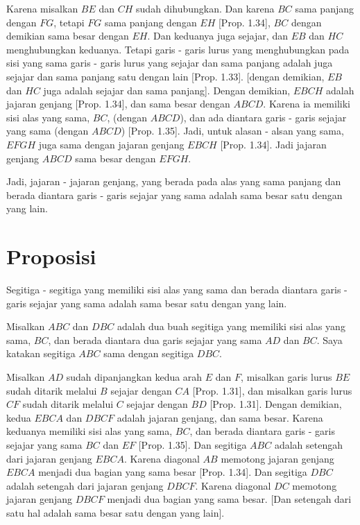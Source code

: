 \documentclass[a4paper]{book}
\begin{document}
Karena misalkan $BE$ dan $CH$ sudah dihubungkan. Dan karena $BC$ sama panjang 
dengan $FG$, tetapi $FG$ sama panjang dengan $EH$ [Prop. 1.34], $BC$ dengan 
demikian sama besar dengan $EH$. Dan keduanya juga sejajar, dan $EB$ dan $HC$
menghubungkan keduanya. Tetapi garis - garis lurus yang menghubungkan pada sisi 
yang sama garis - garis lurus yang sejajar dan sama panjang adalah juga sejajar
dan sama panjang satu dengan lain [Prop. 1.33]. [dengan demikian, $EB$ dan $HC$
juga adalah sejajar dan sama panjang]. Dengan demikian, $EBCH$ adalah jajaran 
genjang [Prop. 1.34], dan sama besar dengan $ABCD$. Karena ia memiliki sisi
alas yang  sama, $BC$, (dengan $ABCD$), dan  ada diantara garis -  garis 
sejajar yang sama (dengan $ABCD$) [Prop. 1.35]. Jadi, untuk alasan - alsan yang
sama, $EFGH$ juga sama dengan jajaran genjang $EBCH$ [Prop. 1.34]. Jadi jajaran
genjang $ABCD$ sama besar dengan $EFGH$.

Jadi, jajaran - jajaran genjang, yang berada pada alas yang sama panjang dan
 berada diantara garis - garis sejajar yang sama adalah sama besar satu 
dengan yang lain.

\section*{\centering Proposisi \thesection} 
Segitiga - segitiga yang memiliki sisi alas yang sama dan berada diantara
garis - garis sejajar yang sama adalah sama besar satu dengan yang lain.
\begin{center}
\end{center}
Misalkan $ABC$ dan $DBC$ adalah dua buah segitiga yang memiliki sisi alas yang
sama, $BC$, dan berada diantara dua garis sejajar yang sama $AD$ dan $BC$.
Saya katakan segitiga $ABC$ sama dengan segitiga $DBC$.

Misalkan $AD$ sudah dipanjangkan kedua arah $E$ dan $F$, misalkan garis lurus
$BE$ sudah ditarik melalui $B$ sejajar dengan $CA$ [Prop. 1.31], dan 
misalkan garis lurus $CF$ sudah ditarik melalui $C$ sejajar dengan $BD$ 
[Prop. 1.31]. Dengan demikian, kedua  $EBCA$ dan $DBCF$ adalah jajaran genjang, 
dan sama besar. Karena keduanya memiliki sisi alas yang sama, $BC$, dan berada
diantara garis - garis sejajar yang sama $BC$ dan $EF$ [Prop. 1.35]. Dan
segitiga $ABC$ adalah setengah dari jajaran genjang $EBCA$. Karena
diagonal $AB$ memotong jajaran genjang $EBCA$ menjadi dua bagian yang sama 
besar [Prop. 1.34]. Dan segitiga $DBC$ adalah setengah dari jajaran genjang 
$DBCF$.
Karena diagonal $DC$ memotong jajaran genjang $DBCF$ menjadi dua bagian yang 
sama besar. [Dan setengah dari satu hal adalah sama besar satu dengan 
yang lain].
\end{document}
